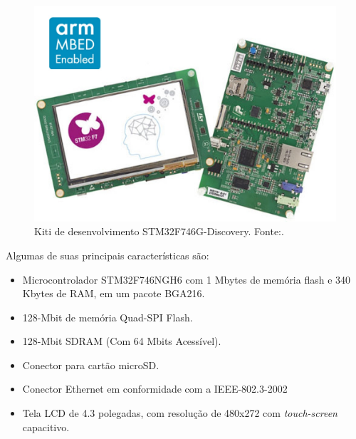 \begin{figure}[H]
    \scriptsize
     \centering
     \includegraphics[scale=0.4]{dados/figuras/STM32F7.jpg}
     \caption{Kiti de desenvolvimento STM32F746G-Discovery. \newline Fonte:\cite{STM32F7}.}
     \label{STM32F7}
\end{figure}

Algumas de suas principais características são:
\begin{itemize}
    \item Microcontrolador STM32F746NGH6 com 1 Mbytes de memória flash e 340 Kbytes de RAM, em um pacote BGA216.
    \item 128-Mbit de memória Quad-SPI Flash.
    \item 128-Mbit SDRAM (Com 64 Mbits Acessível).
    \item Conector para cartão microSD.
    \item Conector Ethernet em conformidade com a IEEE-802.3-2002
    \item Tela LCD de 4.3 polegadas, com resolução de 480x272 com \textit{touch-screen} capacitivo.
    
\end{itemize}
